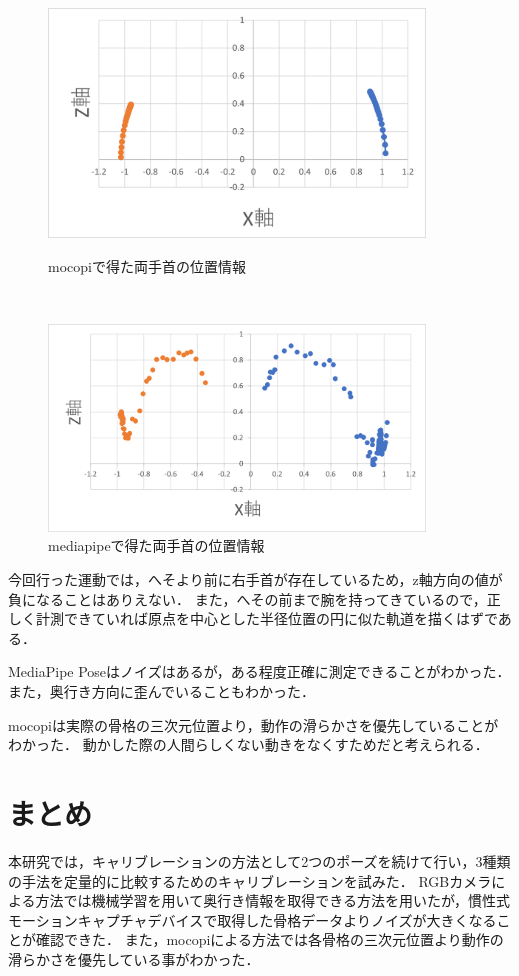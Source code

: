 \documentclass[a4j, fleqn, 12pt]{jsreport}
\begin{document}
\begin{figure}[h]
  \centering
  \begin{minipage}{10cm}
    \centering
    \includegraphics[width=10cm]{img/1_mocopi.png}
    \caption{mocopiで得た両手首の位置情報}
    \label{fig:1_mocopi}
  \end{minipage}\\
  \begin{minipage}{10cm}
    \centering
    \includegraphics[width=10cm]{img/1_media.png}
    \caption{mediapipeで得た両手首の位置情報}
    \label{fig:1_media}
  \end{minipage}
\end{figure}
今回行った運動では，へそより前に右手首が存在しているため，z軸方向の値が負になることはありえない．
また，へその前まで腕を持ってきているので，正しく計測できていれば原点を中心とした半径位置の円に似た軌道を描くはずである．

MediaPipe Poseはノイズはあるが，ある程度正確に測定できることがわかった．
また，奥行き方向に歪んでいることもわかった．

mocopiは実際の骨格の三次元位置より，動作の滑らかさを優先していることがわかった．
動かした際の人間らしくない動きをなくすためだと考えられる．

\chapter{まとめ}
本研究では，キャリブレーションの方法として2つのポーズを続けて行い，3種類の手法を定量的に比較するためのキャリブレーションを試みた．
RGBカメラによる方法では機械学習を用いて奥行き情報を取得できる方法を用いたが，慣性式モーションキャプチャデバイスで取得した骨格データよりノイズが大きくなることが確認できた．
また，mocopiによる方法では各骨格の三次元位置より動作の滑らかさを優先している事がわかった．
\end{document}
